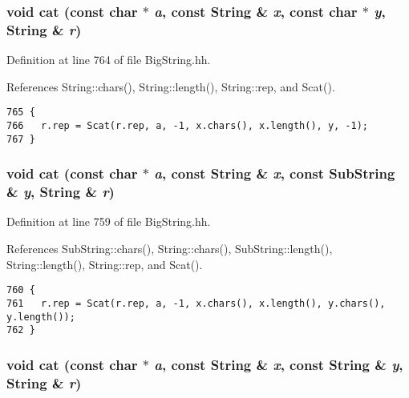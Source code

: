 \subsubsection{\setlength{\rightskip}{0pt plus 5cm}void cat (const char $\ast$ {\em a}, const {\bf String} \& {\em x}, const char $\ast$ {\em y}, {\bf String} \& {\em r})\hspace{0.3cm}{\tt  [inline]}}\label{BigString_8hh_a60}




Definition at line 764 of file Big\-String.hh.

References String::chars(), String::length(), String::rep, and Scat().



\footnotesize\begin{verbatim}765 {
766   r.rep = Scat(r.rep, a, -1, x.chars(), x.length(), y, -1);
767 }
\end{verbatim}\normalsize 
{}
\subsubsection{\setlength{\rightskip}{0pt plus 5cm}void cat (const char $\ast$ {\em a}, const {\bf String} \& {\em x}, const {\bf Sub\-String} \& {\em y}, {\bf String} \& {\em r})\hspace{0.3cm}{\tt  [inline]}}\label{BigString_8hh_a59}




Definition at line 759 of file Big\-String.hh.

References Sub\-String::chars(), String::chars(), Sub\-String::length(), String::length(), String::rep, and Scat().



\footnotesize\begin{verbatim}760 {
761   r.rep = Scat(r.rep, a, -1, x.chars(), x.length(), y.chars(), y.length());
762 }
\end{verbatim}\normalsize 
{}
\subsubsection{\setlength{\rightskip}{0pt plus 5cm}void cat (const char $\ast$ {\em a}, const {\bf String} \& {\em x}, const {\bf String} \& {\em y}, {\bf String} \& {\em r})\hspace{0.3cm}{\tt  [inline]}}\label{BigString_8hh_a58}




